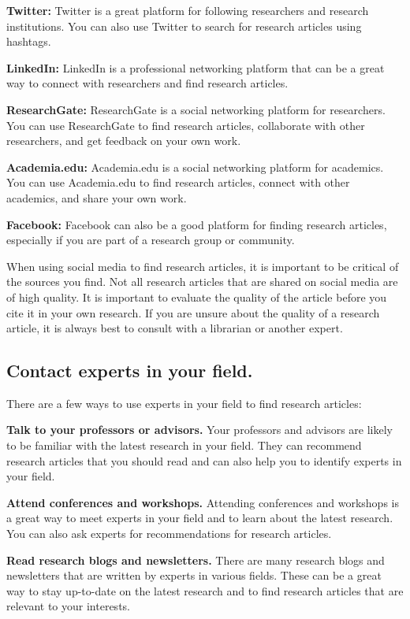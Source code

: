 \documentclass[
]{book}
\begin{document}
\textbf{Twitter:} Twitter is a great platform for following researchers and research institutions. You can also use Twitter to search for research articles using hashtags.

\textbf{LinkedIn:} LinkedIn is a professional networking platform that can be a great way to connect with researchers and find research articles.

\textbf{ResearchGate:} ResearchGate is a social networking platform for researchers. You can use ResearchGate to find research articles, collaborate with other researchers, and get feedback on your own work.

\textbf{Academia.edu:} Academia.edu is a social networking platform for academics. You can use Academia.edu to find research articles, connect with other academics, and share your own work.

\textbf{Facebook:} Facebook can also be a good platform for finding research articles, especially if you are part of a research group or community.

When using social media to find research articles, it is important to be critical of the sources you find. Not all research articles that are shared on social media are of high quality. It is important to evaluate the quality of the article before you cite it in your own research. If you are unsure about the quality of a research article, it is always best to consult with a librarian or another expert.

\subsection*{Contact experts in your field.}\label{contact-experts-in-your-field.}

There are a few ways to use experts in your field to find research articles:

\textbf{Talk to your professors or advisors.} Your professors and advisors are likely to be familiar with the latest research in your field. They can recommend research articles that you should read and can also help you to identify experts in your field.

\textbf{Attend conferences and workshops.} Attending conferences and workshops is a great way to meet experts in your field and to learn about the latest research. You can also ask experts for recommendations for research articles.

\textbf{Read research blogs and newsletters.} There are many research blogs and newsletters that are written by experts in various fields. These can be a great way to stay up-to-date on the latest research and to find research articles that are relevant to your interests.
\end{document}
